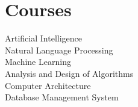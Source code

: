 \documentclass[]{Kauts}
\begin{document}
\begin{minipage}[t]{0.3\textwidth}

\section{Courses}
Artificial Intelligence\\
Natural Language Processing\\
Machine Learning\\
Analysis and Design of Algorithms\\
Computer Architecture\\
Database Management System\\

%
%

\end{minipage} 
\hfill
\end{document}
